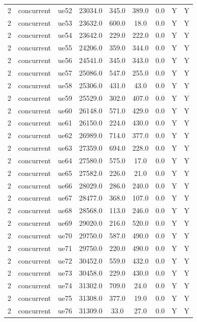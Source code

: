 \begin{table}[ht]
\begin{tabular}{|c|c|c|c|c|c|c|c|c|}
2 & concurrent & ue52 & 23034.0 & 345.0 & 389.0 & 0.0 & Y & Y \\
2 & concurrent & ue53 & 23632.0 & 600.0 & 18.0 & 0.0 & Y & Y \\
2 & concurrent & ue54 & 23642.0 & 229.0 & 222.0 & 0.0 & Y & Y \\
2 & concurrent & ue55 & 24206.0 & 359.0 & 344.0 & 0.0 & Y & Y \\
2 & concurrent & ue56 & 24541.0 & 345.0 & 343.0 & 0.0 & Y & Y \\
2 & concurrent & ue57 & 25086.0 & 547.0 & 255.0 & 0.0 & Y & Y \\
2 & concurrent & ue58 & 25306.0 & 431.0 & 43.0 & 0.0 & Y & Y \\
2 & concurrent & ue59 & 25529.0 & 302.0 & 407.0 & 0.0 & Y & Y \\
2 & concurrent & ue60 & 26148.0 & 571.0 & 429.0 & 0.0 & Y & Y \\
2 & concurrent & ue61 & 26150.0 & 224.0 & 430.0 & 0.0 & Y & Y \\
2 & concurrent & ue62 & 26989.0 & 714.0 & 377.0 & 0.0 & Y & Y \\
2 & concurrent & ue63 & 27359.0 & 694.0 & 228.0 & 0.0 & Y & Y \\
2 & concurrent & ue64 & 27580.0 & 575.0 & 17.0 & 0.0 & Y & Y \\
2 & concurrent & ue65 & 27582.0 & 226.0 & 21.0 & 0.0 & Y & Y \\
2 & concurrent & ue66 & 28029.0 & 286.0 & 240.0 & 0.0 & Y & Y \\
2 & concurrent & ue67 & 28477.0 & 368.0 & 107.0 & 0.0 & Y & Y \\
2 & concurrent & ue68 & 28568.0 & 113.0 & 246.0 & 0.0 & Y & Y \\
2 & concurrent & ue69 & 29020.0 & 216.0 & 520.0 & 0.0 & Y & Y \\
2 & concurrent & ue70 & 29750.0 & 587.0 & 490.0 & 0.0 & Y & Y \\
2 & concurrent & ue71 & 29750.0 & 220.0 & 490.0 & 0.0 & Y & Y \\
2 & concurrent & ue72 & 30452.0 & 559.0 & 432.0 & 0.0 & Y & Y \\
2 & concurrent & ue73 & 30458.0 & 229.0 & 430.0 & 0.0 & Y & Y \\
2 & concurrent & ue74 & 31302.0 & 709.0 & 24.0 & 0.0 & Y & Y \\
2 & concurrent & ue75 & 31308.0 & 377.0 & 19.0 & 0.0 & Y & Y \\
2 & concurrent & ue76 & 31309.0 & 33.0 & 27.0 & 0.0 & Y & Y \\

\end{tabular}
\end{table}
